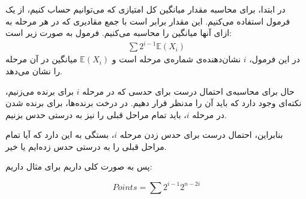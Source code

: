 در ابتدا، برای محاسبه مقدار میانگین کل امتیازی که می‌توانیم حساب کنیم، از یک فرمول استفاده می‌کنیم. این مقدار برابر است با جمع مقادیری که در هر مرحله به ازای آنها میانگین را محاسبه می‌کنیم. فرمول به صورت زیر است:
\begin{gather*}
	\sum 2^{i-1} \mathbb{E}(X_i)
\end{gather*}
در این فرمول، $i$ نشان‌دهنده‌ی شماره‌ی مرحله است و $\mathbb{E}(X_i)$ میانگین در آن مرحله را نشان می‌دهد.

حال برای محاسبه‌ی احتمال درست برای حدسی که در مرحله $i$ برای برنده می‌زنیم، نکته‌ای وجود دارد که باید آن را مدنظر قرار دهیم. در درخت برنده‌ها، برای برنده شدن در مرحله $i$، باید تمام مراحل قبلی را نیز به درستی حدس بزنیم.

بنابراین، احتمال درست برای حدس زدن مرحله $i$، بستگی به این دارد که آیا تمام مراحل قبلی را به درستی حدس زده‌ایم یا خیر.

پس به صورت کلی داریم برای مثال داریم:

$$
Points = \sum 2^{i-1} 2^{n - 2i}
$$